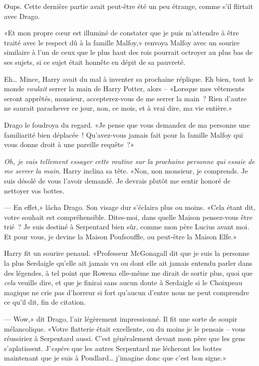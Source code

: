 Oups. Cette dernière partie avait peut-être été un peu étrange, comme s'il flirtait avec Drago.

«Et mon propre cœur est illuminé de constater que je puis m'attendre à être traité avec le respect dû à la famille Malfoy,» renvoya Malfoy avec un sourire similaire à l'un de ceux que le plus haut des rois pourrait octroyer au plus bas de ses sujets, si ce sujet était honnête en dépit de sa pauvreté.

Eh… Mince, Harry avait du mal à inventer sa prochaine réplique. Eh bien, tout le monde \emph{voulait} serrer la main de Harry Potter, alors -- «Lorsque mes vêtements seront apprêtés, monsieur, accepterez-vous de me serrer la main~? Rien d'autre ne saurait parachever ce jour, non, ce mois, et à vrai dire, ma vie entière.»

Drago le foudroya du regard.
«Je pense que vous demandez de ma personne une familiarité bien déplacée~! Qu'avez-vous jamais fait pour la famille Malfoy qui vous donne droit à une pareille requête~?»

\emph{Oh, je vais tellement essayer cette routine sur la prochaine personne qui essaie de me serrer la main}. Harry inclina sa tête.
«Non, non monsieur, je comprends. Je suis désolé de vous l'avoir demandé. Je devrais plutôt me sentir honoré de nettoyer vos bottes.

--- En effet,» lâcha Drago. Son visage dur s'éclaira plus ou moins. «Cela étant dit, votre souhait est compréhensible. Dites-moi, dans quelle Maison pensez-vous être trié~? Je suis destiné à Serpentard bien sûr, comme mon père Lucius avant moi. Et pour vous, je devine la Maison Poufsouffle, ou peut-être la Maison Elfe.»

Harry fit un sourire penaud.
«Professeur McGonagall dit que je suis la personne la plus Serdaigle qu'elle ait jamais vu ou dont elle ait jamais entendu parler dans des légendes, à tel point que Rowena elle-même me dirait de sortir plus, quoi que \emph{cela} veuille dire, et que je finirai sans aucun doute à Serdaigle si le Choixpeau magique ne crie pas d'horreur si fort qu'aucun d'entre nous ne peut comprendre ce qu'il dit, fin de citation.

--- Wow,» dit Drago, l'air légèrement impressionné. Il fit une sorte de soupir mélancolique. «Votre flatterie était excellente, ou du moins je le pensais -- vous réussiriez à Serpentard aussi. C'est généralement devant mon père que les gens s'aplatissent. J'\emph{espère} que les autres Serpentard me lécheront les bottes maintenant que je suis à Poudlard… j'imagine donc que c'est bon signe.»


